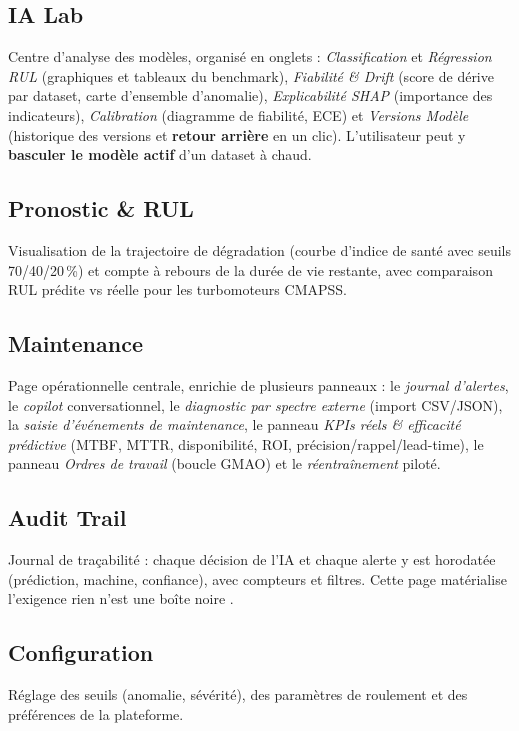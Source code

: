 \subsection{IA Lab}
Centre d'analyse des modèles, organisé en onglets : \emph{Classification} et
\emph{Régression RUL} (graphiques et tableaux du benchmark), \emph{Fiabilité \& Drift}
(score de dérive par dataset, carte d'ensemble d'anomalie), \emph{Explicabilité SHAP}
(importance des indicateurs), \emph{Calibration} (diagramme de fiabilité, ECE) et
\emph{Versions Modèle} (historique des versions et \textbf{retour arrière} en un clic).
L'utilisateur peut y \textbf{basculer le modèle actif} d'un dataset à chaud.

\subsection{Pronostic \& RUL}
Visualisation de la trajectoire de dégradation (courbe d'indice de santé avec seuils
70/40/20\,\%) et compte à rebours de la durée de vie restante, avec comparaison RUL prédite
vs réelle pour les turbomoteurs CMAPSS.

\subsection{Maintenance}
Page opérationnelle centrale, enrichie de plusieurs panneaux : le \emph{journal d'alertes},
le \emph{copilot} conversationnel, le \emph{diagnostic par spectre externe} (import CSV/JSON),
la \emph{saisie d'événements de maintenance}, le panneau \emph{KPIs réels \& efficacité
prédictive} (MTBF, MTTR, disponibilité, ROI, précision/rappel/lead-time), le panneau
\emph{Ordres de travail} (boucle GMAO) et le \emph{réentraînement} piloté.

\subsection{Audit Trail}
Journal de traçabilité : chaque décision de l'IA et chaque alerte y est horodatée
(prédiction, machine, confiance), avec compteurs et filtres. Cette page matérialise
l'exigence \og rien n'est une boîte noire \fg.

\subsection{Configuration}
Réglage des seuils (anomalie, sévérité), des paramètres de roulement et des préférences de
la plateforme.

